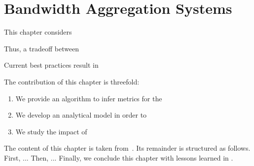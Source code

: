 \chapter{Bandwidth Aggregation Systems}\label{chap:network}

This chapter considers


Thus, a tradeoff between

Current best practices result in

The contribution of this chapter is threefold:
\begin{enumerate}
\item We provide an algorithm to infer metrics for the
\item We develop an analytical model in order to
\item We study the impact of
\end{enumerate}

The content of this chapter is taken from~\cite{info3-article-2016-3}.
Its remainder is structured as follows.
First, ...
Then, ...
Finally, we conclude this chapter with lessons learned in .


% 


